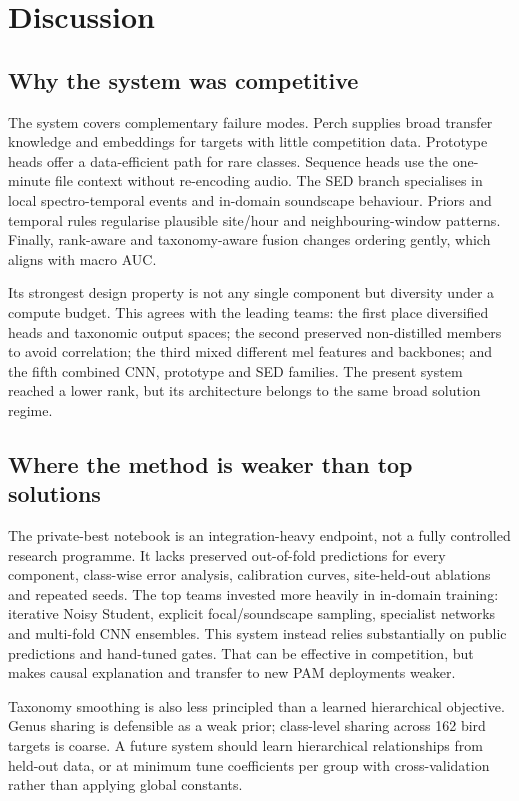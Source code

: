 \documentclass[10pt,a4paper]{article}
\begin{document}
\section{Discussion}
\subsection{Why the system was competitive}
The system covers complementary failure modes. Perch supplies broad transfer knowledge and embeddings for targets with little competition data. Prototype heads offer a data-efficient path for rare classes. Sequence heads use the one-minute file context without re-encoding audio. The SED branch specialises in local spectro-temporal events and in-domain soundscape behaviour. Priors and temporal rules regularise plausible site/hour and neighbouring-window patterns. Finally, rank-aware and taxonomy-aware fusion changes ordering gently, which aligns with macro AUC.

Its strongest design property is not any single component but diversity under a compute budget. This agrees with the leading teams: the first place diversified heads and taxonomic output spaces; the second preserved non-distilled members to avoid correlation; the third mixed different mel features and backbones; and the fifth combined CNN, prototype and SED families. The present system reached a lower rank, but its architecture belongs to the same broad solution regime.

\subsection{Where the method is weaker than top solutions}
The private-best notebook is an integration-heavy endpoint, not a fully controlled research programme. It lacks preserved out-of-fold predictions for every component, class-wise error analysis, calibration curves, site-held-out ablations and repeated seeds. The top teams invested more heavily in in-domain training: iterative Noisy Student, explicit focal/soundscape sampling, specialist networks and multi-fold CNN ensembles. This system instead relies substantially on public predictions and hand-tuned gates. That can be effective in competition, but makes causal explanation and transfer to new PAM deployments weaker.

Taxonomy smoothing is also less principled than a learned hierarchical objective. Genus sharing is defensible as a weak prior; class-level sharing across 162 bird targets is coarse. A future system should learn hierarchical relationships from held-out data, or at minimum tune coefficients per group with cross-validation rather than applying global constants.
\end{document}
